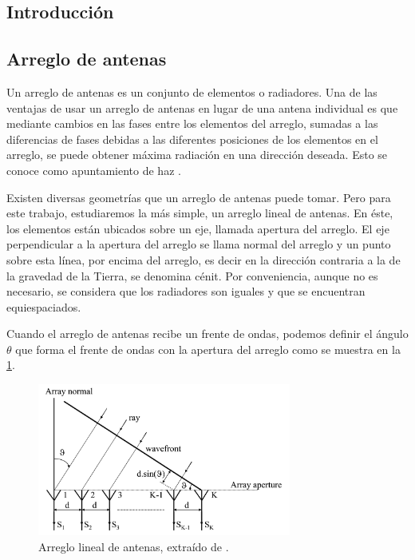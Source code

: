 \documentclass{article}
\newenvironment{standalone}{\begin{preview}}{\end{preview}}
\begin{document}
\begin{standalone}
  \section{Introducción}

  \subsection{Arreglo de antenas} \label{subsec:arreglo}

  Un arreglo de antenas es un conjunto de elementos o radiadores.
  Una de las ventajas de usar un arreglo de antenas en lugar de una antena individual es que mediante cambios en las fases entre los elementos del arreglo, sumadas a las diferencias de fases debidas a las diferentes posiciones de los elementos en el arreglo, se puede obtener máxima radiación en una dirección deseada.
  Esto se conoce como apuntamiento de haz \cite{visser2005}.

  Existen diversas geometrías que un arreglo de antenas puede tomar.
  Pero para este trabajo, estudiaremos la más simple, un arreglo lineal de antenas.
  En éste, los elementos están ubicados sobre un eje, llamada apertura del arreglo.
  El eje perpendicular a la apertura del arreglo se llama normal del arreglo y un punto sobre esta línea, por encima del arreglo, es decir en la dirección contraria a la de la gravedad de la Tierra, se denomina cénit.
  Por conveniencia, aunque no es necesario, se considera que los radiadores son iguales y que se encuentran equiespaciados.

  Cuando el arreglo de antenas recibe un frente de ondas, podemos definir el ángulo $\theta$ que forma el frente de ondas con la apertura del arreglo como se muestra en la \cref{fig:arreglo-antenas}.

  \begin{figure}[!htbp]
    \centering
    \includegraphics[width=\linewidth, height=50mm, keepaspectratio]{../images/arreglo-antenas.jpg}
    \caption{Arreglo lineal de antenas, extraído de \cite{visser2005}.}
    \label{fig:arreglo-antenas}
  \end{figure}


\end{standalone}
\end{document}
